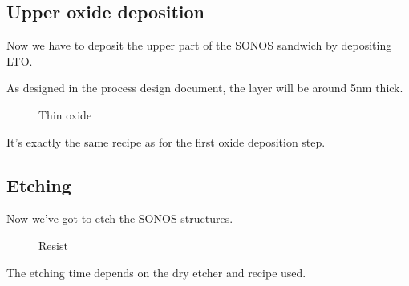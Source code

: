 \newpage

\subsection{Upper oxide deposition}\label{step_growing_gate_oxide}

Now we have to deposit the upper part of the SONOS sandwich by depositing LTO.

As designed in the process design document, the layer will be around 5nm thick.

\begin{figure}[H]
	\centering
	\begin{tikzpicture}[node distance = 3cm, auto, thick,scale=\CrossSectionOnly, every node/.style={transform shape}]
		
	\end{tikzpicture}
	\begin{tikzpicture}[node distance = 3cm, auto, thick,scale=\CrossSectionOnly, every node/.style={transform shape}]
		
	\end{tikzpicture}
	\caption{Thin oxide}
\end{figure}

It's exactly the same recipe as for the first oxide deposition step.

\subsection{Etching}

Now we've got to etch the SONOS structures.

\begin{figure}[H]
	\centering
	\begin{tikzpicture}[node distance = 3cm, auto, thick,scale=\CrossAndTopSection, every node/.style={transform shape}]
		
	\end{tikzpicture}
	\drawStepArrow{}
	\begin{tikzpicture}[node distance = 3cm, auto, thick,scale=\CrossAndTopSection, every node/.style={transform shape}]
		
	\end{tikzpicture}
	\caption{Resist}
\end{figure}

The etching time depends on the dry etcher and recipe used.

